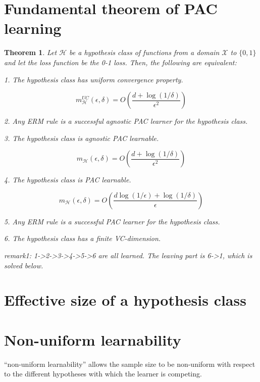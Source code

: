 \documentclass{article}
\newtheorem{theorem}{Theorem}
\begin{document}
\section{Fundamental theorem of PAC learning}

	\begin{theorem}
	Let $\mathcal{H}$ be a hypothesis class of functions from a domain $\mathcal{X}$ to $\{0,1\}$ and let the loss function be the 0-1 loss. Then, the following are equivalent:
	
	1. The hypothesis class has uniform convergence property.

	\begin{equation}
	m_\mathcal{H}^{UC}(\epsilon,\delta)=O\left(\frac{d+\log(1/\delta)}{\epsilon^2}\right)	
	\end{equation}

	2. Any ERM rule is a successful agnostic PAC learner for the hypothesis class.
	
	3. The hypothesis class is agnostic PAC learnable.
	
	\begin{equation}
	m_\mathcal{H}(\epsilon,\delta)=O\left(\frac{d+\log(1/\delta)}{\epsilon^2}\right)	
	\end{equation}

	4. The hypothesis class is PAC learnable.

	\begin{equation}
	m_\mathcal{H}(\epsilon,\delta)=O\left(\frac{d\log(1/\epsilon)+\log(1/\delta)}{\epsilon}\right)
	\end{equation}

	5. Any ERM rule is a successful PAC learner for the hypothesis class.
	
	6. The hypothesis class has a finite VC-dimension.
	\end{theorem}
	
	\textit{remark1: 1->2->3->4->5->6 are all learned. The leaving part is 6->1, which is solved below.}

\section{Effective size of a hypothesis class}

\section{Non-uniform learnability}

“non-uniform learnability” allows the sample size to be non-uniform with respect to the different hypotheses with which the learner is competing. 
\end{document}
